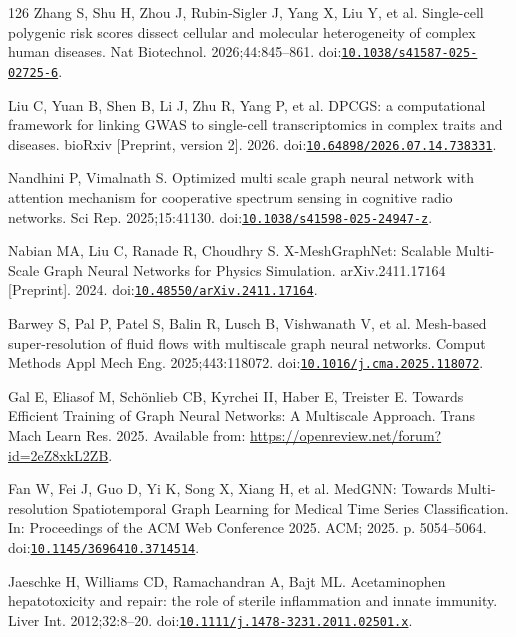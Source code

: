 \begin{thebibliography}{126}
Zhang S, Shu H, Zhou J, Rubin-Sigler J, Yang X, Liu Y, et al. Single-cell polygenic risk scores dissect cellular and molecular heterogeneity of complex human diseases. Nat Biotechnol. 2026;44:845--861. doi:\href{https://doi.org/10.1038/s41587-025-02725-6}{\nolinkurl{10.1038/s41587-025-02725-6}}.

Liu C, Yuan B, Shen B, Li J, Zhu R, Yang P, et al. DPCGS: a computational framework for linking GWAS to single-cell transcriptomics in complex traits and diseases. bioRxiv [Preprint, version 2]. 2026. doi:\href{https://doi.org/10.64898/2026.07.14.738331}{\nolinkurl{10.64898/2026.07.14.738331}}.

Nandhini P, Vimalnath S. Optimized multi scale graph neural network with attention mechanism for cooperative spectrum sensing in cognitive radio networks. Sci Rep. 2025;15:41130. doi:\href{https://doi.org/10.1038/s41598-025-24947-z}{\nolinkurl{10.1038/s41598-025-24947-z}}.

Nabian MA, Liu C, Ranade R, Choudhry S. X-MeshGraphNet: Scalable Multi-Scale Graph Neural Networks for Physics Simulation. arXiv.2411.17164 [Preprint]. 2024. doi:\href{https://doi.org/10.48550/arXiv.2411.17164}{\nolinkurl{10.48550/arXiv.2411.17164}}.

Barwey S, Pal P, Patel S, Balin R, Lusch B, Vishwanath V, et al. Mesh-based super-resolution of fluid flows with multiscale graph neural networks. Comput Methods Appl Mech Eng. 2025;443:118072. doi:\href{https://doi.org/10.1016/j.cma.2025.118072}{\nolinkurl{10.1016/j.cma.2025.118072}}.

Gal E, Eliasof M, Schönlieb CB, Kyrchei II, Haber E, Treister E. Towards Efficient Training of Graph Neural Networks: A Multiscale Approach. Trans Mach Learn Res. 2025. Available from: \url{https://openreview.net/forum?id=2eZ8xkL2ZB}.

Fan W, Fei J, Guo D, Yi K, Song X, Xiang H, et al. MedGNN: Towards Multi-resolution Spatiotemporal Graph Learning for Medical Time Series Classification. In: Proceedings of the ACM Web Conference 2025. ACM; 2025. p. 5054--5064. doi:\href{https://doi.org/10.1145/3696410.3714514}{\nolinkurl{10.1145/3696410.3714514}}.

Jaeschke H, Williams CD, Ramachandran A, Bajt ML. Acetaminophen hepatotoxicity and repair: the role of sterile inflammation and innate immunity. Liver Int. 2012;32:8--20. doi:\href{https://doi.org/10.1111/j.1478-3231.2011.02501.x}{\nolinkurl{10.1111/j.1478-3231.2011.02501.x}}.


\end{thebibliography}
